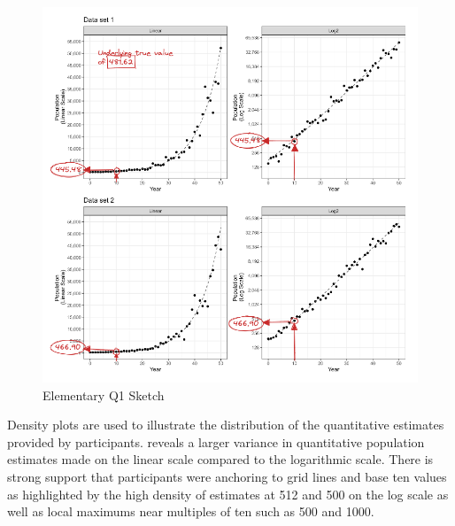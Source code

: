 \documentclass[print]{nuthesis}
\begin{document}
\begin{figure}[tbp]

{\centering \includegraphics[width=1\linewidth,]{images/03-estimation/qe1-sketch} 

}

\caption{Elementary Q1 Sketch}\label{fig:qe1-sketch}
\end{figure}

Density plots are used to illustrate the distribution of the quantitative estimates provided by participants.
 reveals a larger variance in quantitative population estimates made on the linear scale compared to the logarithmic scale.
There is strong support that participants were anchoring to grid lines and base ten values as highlighted by the high density of estimates at 512 and 500 on the log scale as well as local maximums near multiples of ten such as 500 and 1000.
\end{document}
